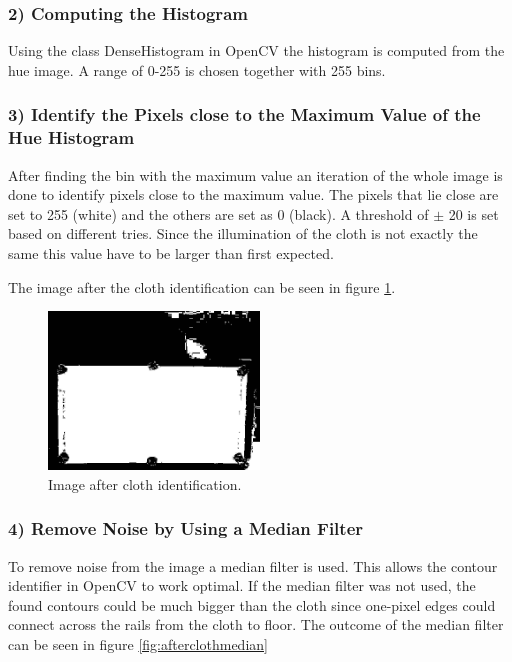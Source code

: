 \subsubsection{2) Computing the Histogram}
Using the class DenseHistogram in OpenCV the histogram is computed from the hue image. A range of 0-255 is chosen together with 255 bins.

\subsubsection{3) Identify the Pixels close to the Maximum Value of the Hue Histogram}
After finding the bin with the maximum value an iteration of the whole image is done to identify pixels close to the maximum value. The pixels that lie close are set to 255 (white) and the others are set as 0 (black). A threshold of $\pm$ 20 is set based on different tries. Since the illumination of the cloth is not exactly the same this value have to be larger than first expected.

The image after the cloth identification can be seen in figure \ref{fig:aftercloth}.

\begin{figure}[H]
\begin{center}
\leavevmode
\includegraphics[width=0.5\textwidth]{images/aftercloth}
\end{center}
\caption{Image after cloth identification.}
\label{fig:aftercloth}
\end{figure}

\subsubsection{4) Remove Noise by Using a Median Filter}
To remove noise from the image a median filter is used. This allows the contour identifier in OpenCV to work optimal. If the median filter was not used, the found contours could be much bigger than the cloth since one-pixel edges could connect across the rails from the cloth to floor. The outcome of the median filter can be seen in figure \ref{fig:afterclothmedian}

